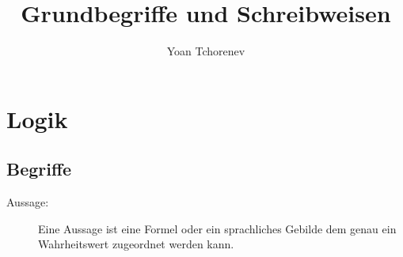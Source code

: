 \documentclass[12pt,a4paper]{article}
\title{Grundbegriffe und Schreibweisen}
\author{Yoan Tchorenev}
\begin{document}
\begin{titlepage}
	\maketitle
	\tableofcontents
\end{titlepage}

\section{Logik}
\subsection{Begriffe}
\begin{description}
	\item[Aussage:] Eine Aussage ist eine Formel oder ein sprachliches Gebilde dem genau ein Wahrheitswert zugeordnet werden kann.


\end{description}
\end{document}
